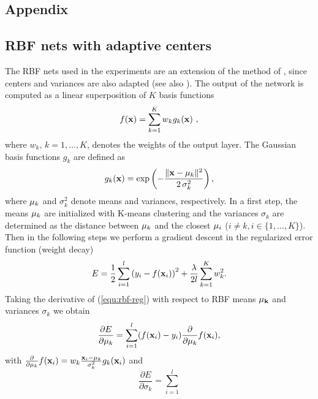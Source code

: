 \documentclass{article}
\begin{document}
\begin{appendix}
\section{Appendix}
\subsection{RBF nets with adaptive centers}
\label{app:rbf}

The RBF nets used in the experiments are an extension of the method of
\cite{MooDar89}, since centers and variances are also adapted (see also
\cite{Bis95,MueSmoRaeSchKohVap98}). The output of the network is
computed as a linear superposition of $K$ basis functions
\begin{equation}
  f({\bf x})=\sum_{k=1}^K w_k g_k({\bf x})~,
\end{equation}
where $w_k$, $k=1, \dots, K$, denotes the weights of the output layer.
The Gaussian basis functions $g_k$ are defined as
\begin{equation}
  g_k({\bf x})= \exp\left(-\frac{\|{\bf x}-{\bf \mu}_k\|^2}{2\,\sigma_k^2}\right),
\end{equation}
where ${\bf \mu}_k$ and $\sigma_k^2$ denote means and variances,
respectively. In a first step, the means ${\bf \mu}_k$ are initialized
with K-means clustering and the variances $\sigma_k$ are determined as
the distance between ${\bf \mu}_k$ and the closest ${\bf \mu}_i$
($i\ne k, i\in \{1,\ldots,K\}$). Then in the following steps we
perform a gradient descent in the regularized error function (weight
decay)
\begin{equation}
  E = \frac{1}{2}\sum_{i=1}^l \left(y_i - f({\bf x}_i)\right)^2 +
  \frac{\lambda}{2 l} \sum_{k=1}^K w_k^2.
\label{equ:rbf-reg}
\end{equation}
%
%
Taking the derivative of (\ref{equ:rbf-reg}) with respect to
RBF means $\bf\mu_k$ and variances $\sigma_k$ we obtain
\begin{equation}
  \frac{\partial E}{\partial {\bf \mu}_k} =
    \sum_{i=1}^l (f({\bf x}_i)- y_i)\frac{\partial}{\partial {\bf \mu}_k}f({\bf x}_i),
  \label{equ:grad_C_mu}
\end{equation}
with $\frac{\partial}{\partial {\bf \mu}_k} f({\bf x}_i) = w_k\frac{{\bf x}_i-{\bf
    \mu}_k}{\sigma_k^2} g_k({\bf x}_i)$ and
\begin{equation}
  \frac{\partial E}{\partial \sigma_k} = \sum_{i=1}^l

\end{equation}
\end{appendix}
\end{document}
